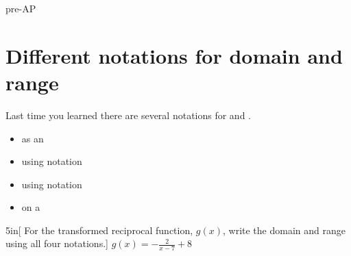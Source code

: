 \begin{taggedblock}{pre-AP}

    
\section{Different notations for domain and range}

Last time you learned 
there are several notations for  and .
\begin{itemize}[nosep]
    \item as an 
    \item using  notation
    \item using  notation
    \item on a 
\end{itemize}

\begin{myWideProblem}{5in}[%
    For the transformed reciprocal function, $g(x)$, write the domain and range 
    using all four notations.]
    {
        $g(x) = - \frac{2}{x-7} + 8$
    }
\end{myWideProblem}

\end{taggedblock}



